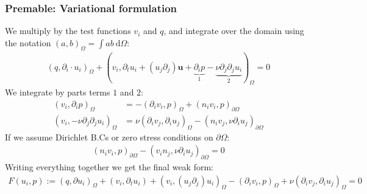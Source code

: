 \documentclass[c,11pt,xcolor=dvipsnames, aspectratio=169]{beamer}
\begin{document}
\begin{frame}
	\frametitle{\textbf{Premable: Variational formulation}}
	We multiply by the test functions $v_i$ and $q$, and integrate over the domain using the notation $(a, b)_{\Omega} = \int a b \ \text{d}\Omega$:
	\begin{align*}
		\left( q, \partial_i \cdot u_i \right)_{\Omega} + (v_i, \partial_t u_i + (u_j \partial_j) \bm{u} + \underbrace{\partial_i p}_{1} - \underbrace{\nu \partial_j \partial_j u_i}_{2})_{\Omega} = 0
	\end{align*}
	We integrate by parts terms $1$ and $2$:
	\begin{align*}
		({v}_i, \partial_i p)_{\Omega} &= - (\partial_i  {v}_i, p)_{\Omega} + ( n_i  {v}_i, p)_{\partial\Omega} \\
		({v}_i, -\nu \partial_j \partial_j {u}_i)_{\Omega} &= \nu (\partial_i {v}_j,  \partial_i {u}_j)_{\Omega} - (n_i {v}_j, \nu \partial_i {u}_j)_{\partial\Omega} 
	\end{align*}
	If we assume Dirichlet B.Cs or zero stress conditions on $\partial\Omega$:
	\begin{align*}
		( {n}_i {v}_i, p)_{\partial\Omega} - ({v}_i {n}_j, \nu \partial_i {u}_j)_{\partial\Omega} = 0
	\end{align*}
	Writing everything together we get the final weak form:
	\begin{align*}
		F({u}_i, p) := \left( q, \partial {u}_i \right)_{\Omega} + (v_i, \partial_t {u}_i)  + {({v}_i, ({u}_j \partial_j) {u}_i)_{\Omega}} 
		- (\partial_i  {v}_i, p)_{\Omega} + \nu (\partial_i {v}_j, \partial_i {u}_j)_{\Omega}  = 0
	\end{align*}
\end{frame}
\end{document}
